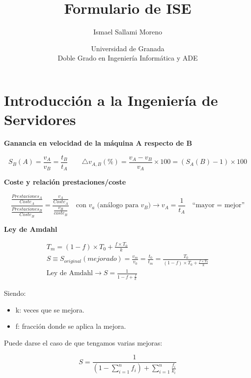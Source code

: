 \documentclass[a4paper,12pt]{article}
\title{\textbf{Formulario de ISE}}
\author{Ismael Sallami Moreno}
\date{\small Universidad de Granada\\ Doble Grado en Ingeniería Informática y ADE}
\begin{document}
\maketitle
\thispagestyle{fancy}

\vspace{1cm}

\section*{Introducción a la Ingeniería de Servidores}

\textbf{Ganancia en velocidad de la máquina A respecto de B}
\begin{tcolorbox}[colback=yellow!5!white, colframe=yellow!75!black]
$$
S_B(A) = \frac{v_A}{v_B} = \frac{t_B}{t_A} \quad \quad \triangle v_{A,B}(\%) = \frac{v_A-v_B}{v_A} \times 100 = (S_A(B) - 1) \times 100
$$
\end{tcolorbox}

\textbf{Coste y relación prestaciones/coste}

\begin{tcolorbox}[colback=yellow!5!white, colframe=yellow!75!black]
    $$
    \frac{\frac{Prestaciones_A}{Coste_A}}{\frac{Prestaciones_B}{Coste_B}} = \frac{\frac{v_A}{Coste_A}}{\frac{v_B}{coste_B}} \quad \text{con $v_a$ (análogo para $v_B$)} \rightarrow v_A = \frac{1}{t_A} \quad \text{``mayor = mejor''}
    $$
    \end{tcolorbox}


\textbf{Ley de Amdahl}

\begin{tcolorbox}[colback=yellow!5!white, colframe=yellow!75!black]
    \begin{align*}
        T_m = (1-f) \times T_0 + \frac{f\times T_0}{k} \\
        S \equiv S_{original}(mejorado) = \frac{v_m}{v_0} = \frac{t_0}{t_m} = \frac{T_0}{(1-f) \times T_0 + \frac{f\times T_0}{k}} \\
        \text{Ley de Amdahl} \rightarrow S = \frac{1}{1-f+\frac{f}{k}}
    \end{align*}
    \end{tcolorbox}
    Siendo:
\begin{itemize}
    \item k: veces que se mejora.
    \item f: fracción donde se aplica la mejora.
\end{itemize}

Puede darse el caso de que tengamos varias mejoras:
\begin{tcolorbox}[colback=yellow!5!white, colframe=yellow!75!black]
    $$
    S = \frac{1}{(1-\sum_{i=1}^n f_i)+ \sum_{i=1}^n \frac{f_i}{k_i}}
    $$
    \end{tcolorbox}
\end{document}

